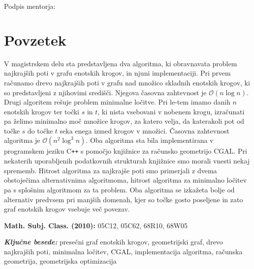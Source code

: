 \documentclass[a4paper, 12pt]{book}
\newcommand{\OO}{\ensuremath{\mathcal{O}}} %
\newcommand{\clearemptydoublepage}{\newpage{\pagestyle{empty}\cleardoublepage}}
\begin{document}
\hspace*{\fill}Podpis mentorja:~~~~~
\clearemptydoublepage
\def\thepage{}
\chapter*{Povzetek}
V magistrskem delu sta predstavljena dva algoritma, ki obravnavata problem najkrajših poti v grafu enotskih krogov, in njuni implementaciji. Pri prvem računamo drevo najkrajših poti v grafu nad množico skladnih enotskih krogov, ki so predstavljeni z njihovimi središči. Njegova časovna zahtevnost je $\OO(n\log n)$. Drugi algoritem rešuje problem minimalne ločitve. Pri le-tem imamo danih $n$ enotskih krogov ter točki $s$ in $t$, ki nista vsebovani v nobenem krogu, izračunati pa želimo minimalno moč množice krogov, za katero velja, da katerakoli pot od točke $s$ do točke $t$ seka enega izmed krogov v množici. Časovna zahtevnost algoritma je $\OO(n^2\log^3n)$. Oba algoritma sta bila implementirana v programskem jeziku C\texttt{+}\texttt{+} s pomočjo knjižnice za računsko geometrijo CGAL. Pri nekaterih uporabljenih podatkovnih strukturah knjižnice smo morali vnesti nekaj sprememb. Hitrost algoritma za najkrajše poti smo primerjali z dvema obstoječima alternativnima algoritmoma, hitrost algoritma za minimalno ločitev pa s splošnim algoritmom za ta problem. Oba algoritma se izkažeta bolje od alternativ predvsem pri manjših domenah, kjer so točke gosto poseljene in zato graf enotskih krogov vsebuje več povezav.
\bigbreak

\begin{flushleft}
\textbf{Math. Subj. Class. (2010): } 05C12, 05C62, 68R10, 68W05

\textbf{\textit{Ključne besede: }}presečni graf enotskih krogov, geometrijski graf, drevo najkrajših poti, minimalna ločitev, CGAL, implementacija algoritma, računska geometrija, geometrijska optimizacija
\end{flushleft}
\clearemptydoublepage
\end{document}
